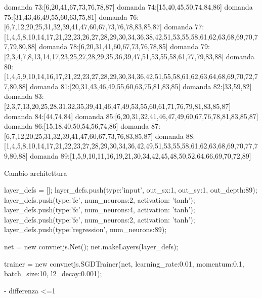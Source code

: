 domanda 73:[6,20,41,67,73,76,78,87]
domanda 74:[15,40,45,50,74,84,86]
domanda 75:[31,43,46,49,55,60,63,75,81]
domanda 76:[6,7,12,20,25,31,32,39,41,47,60,67,73,76,78,83,85,87]
domanda 77:[1,4,5,8,10,14,17,21,22,23,26,27,28,29,30,34,36,38,42,51,53,55,58,61,62,63,68,69,70,77,79,80,88]
domanda 78:[6,20,31,41,60,67,73,76,78,85]
domanda 79:[2,3,4,7,8,13,14,17,23,25,27,28,29,35,36,39,47,51,53,55,58,61,77,79,83,88]
domanda 80:[1,4,5,9,10,14,16,17,21,22,23,27,28,29,30,34,36,42,51,55,58,61,62,63,64,68,69,70,72,77,80,88]
domanda 81:[20,31,43,46,49,55,60,63,75,81,83,85]
domanda 82:[33,59,82]
domanda 83:[2,3,7,13,20,25,28,31,32,35,39,41,46,47,49,53,55,60,61,71,76,79,81,83,85,87]
domanda 84:[44,74,84]
domanda 85:[6,20,31,32,41,46,47,49,60,67,76,78,81,83,85,87]
domanda 86:[15,18,40,50,54,56,74,86]
domanda 87:[6,7,12,20,25,31,32,39,41,47,60,67,73,76,83,85,87]
domanda 88:[1,4,5,8,10,14,17,21,22,23,27,28,29,30,34,36,42,49,51,53,55,58,61,62,63,68,69,70,77,79,80,88]
domanda 89:[1,5,9,10,11,16,19,21,30,34,42,45,48,50,52,64,66,69,70,72,89]

Cambio architettura

layer_defs = [];
layer_defs.push({type:'input', out_sx:1, out_sy:1, out_depth:89});
layer_defs.push({type:'fc', num_neurons:2, activation: 'tanh'});
layer_defs.push({type:'fc', num_neurons:4, activation: 'tanh'});
layer_defs.push({type:'fc', num_neurons:2, activation: 'tanh'});
layer_defs.push({type:'regression', num_neurons:89});

net = new convnetjs.Net();
net.makeLayers(layer_defs);

trainer = new convnetjs.SGDTrainer(net, {learning_rate:0.01, momentum:0.1, batch_size:10, l2_decay:0.001});


- differenza <=1

